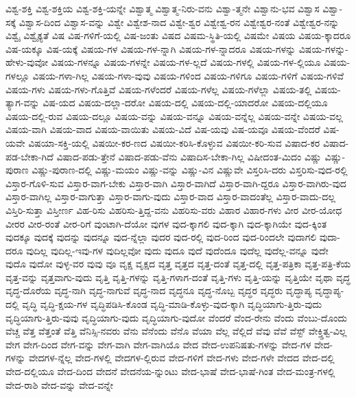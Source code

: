 {ವಿಶ್ವ-ಶಕ್ತಿ
ವಿಶ್ವ-ಶಕ್ತಿಯ
ವಿಶ್ವ-ಶಕ್ತಿ-ಯನ್ನೇ
ವಿಶ್ವಾತ್ಮ
ವಿಶ್ವಾತ್ಮ-ನಿರು-ವನು
ವಿಶ್ವಾ-ತ್ಮನೇ
ವಿಶ್ವಾನು-ಭವ
ವಿಶ್ವಾಸ
ವಿಶ್ವಾ-ಸಕ್ಕೆ
ವಿಶ್ವಾಸ-ದಿಂದ
ವಿಶ್ವಾಸ-ವನ್ನು
ವಿಶ್ವೇ
ವಿಶ್ವೇಶ-ನಾದ
ವಿಶ್ವೇ-ಶ್ವರ
ವಿಶ್ವೇಶ್ವ-ರನ
ವಿಶ್ವೇಶ್ವರ-ನಂತೆ
ವಿಶ್ವೇಶ್ವರ-ನನ್ನು
ವಿಶ್ವೈ
ವಿಶ್ವೈಕ್ಯತೆ
ವಿಷ
ವಿಷ-ಗಳಿಗೆ-ಯಲ್ಲಿ
ವಿಷ-ಜಂತು
ವಿಷದ
ವಿಷಮ-ಸ್ಥಿತಿ-ಯಲ್ಲಿ
ವಿಷಮೇ
ವಿಷಯ
ವಿಷಯ-ಕ್ಕಾದರೂ
ವಿಷ-ಯಕ್ಕೂ
ವಿಷ-ಯಕ್ಕೆ
ವಿಷಯ-ಗಳ
ವಿಷಯ-ಗಳ-ನ್ನಾಗಿ
ವಿಷಯ-ಗಳ-ನ್ನಾದರೂ
ವಿಷಯ-ಗಳನ್ನು
ವಿಷಯ-ಗಳನ್ನು-ಹೇಳು-ವುವೋ
ವಿಷಯ-ಗಳನ್ನೂ
ವಿಷಯ-ಗಳನ್ನೇ
ವಿಷಯ-ಗಳ-ಲ್ಲದೆ
ವಿಷಯ-ಗಳಲ್ಲಿ
ವಿಷಯ-ಗಳ-ಲ್ಲಿಯೂ
ವಿಷಯ-ಗಳಲ್ಲೂ
ವಿಷಯ-ಗಳಾ-ಗಿಲ್ಲ
ವಿಷಯ-ಗಳಾ-ವುವು
ವಿಷಯ-ಗಳಿಂದ
ವಿಷಯ-ಗಳಿಗೂ
ವಿಷಯ-ಗಳಿಗೆ
ವಿಷಯ-ಗಳಿವೆ
ವಿಷಯ-ಗಳು
ವಿಷಯ-ಗಳು-ಗೊತ್ತಿವೆ
ವಿಷಯ-ಗಳೆಂದರೆ
ವಿಷಯ-ಗಳೆಲ್ಲ
ವಿಷಯ-ಗಳೆಲ್ಲಾ
ವಿಷಯ-ತಲ್ಲಿ
ವಿಷಯ-ತ್ಯಾಗ-ವನ್ನು
ವಿಷ-ಯದ
ವಿಷಯ-ದಲ್ಲಾ-ದರೋ
ವಿಷಯ-ದಲ್ಲಿ
ವಿಷಯ-ದಲ್ಲಿ-ಯಾದರೋ
ವಿಷಯ-ದಲ್ಲಿಯೂ
ವಿಷಯ-ದಲ್ಲಿ-ರುವ
ವಿಷಯ-ದಲ್ಲೂ
ವಿಷಯ-ವನ್ನು
ವಿಷಯ-ವನ್ನೂ
ವಿಷಯ-ವನ್ನೆಲ್ಲ
ವಿಷಯ-ವನ್ನೇ
ವಿಷಯ-ವಲ್ಲ
ವಿಷಯ-ವಾಗಿ
ವಿಷಯ-ವಾದ
ವಿಷಯ-ವಾಯಿತು
ವಿಷಯ-ವಿದೆ
ವಿಷ-ಯವು
ವಿಷ-ಯವೂ
ವಿಷಯ-ವೆಂದರೆ
ವಿಷ-ಯವೇ
ವಿಷಯಾ-ಸಕ್ತಿ-ಯಲ್ಲಿ
ವಿಷಯೀ-ಕರ-ಣದ
ವಿಷಯೀ-ಕರಿಸಿ-ಕೊಳ್ಳುವ
ವಿಷಯೀ-ಕರಿ-ಸುವ
ವಿಷಾದ-ಕರ
ವಿಷಾದ-ಪಡ-ಬೇಕಾ-ಗಿದೆ
ವಿಷಾದ-ಪಡು-ತ್ತೇನೆ
ವಿಷಾದ-ಪಡು-ವೆನು
ವಿಷಾದಿಸ-ಬೇಕಾ-ಗಿಲ್ಲ
ವಿಷೀದಂತ-ಮಿದಂ
ವಿಷ್ಣು
ವಿಷ್ಣು-ಪುರಾಣ
ವಿಷ್ಣು-ಪುರಾಣ-ದಲ್ಲಿ
ವಿಷ್ಣು-ಮಯಂ
ವಿಷ್ಣು-ವನ್ನು
ವಿಷ್ಣು-ವಿನ
ವಿಷ್ಣುವೇ
ವಿಸ್ತರಿಸಿ-ದರು
ವಿಸ್ತರಿಸು-ವುದ-ರಲ್ಲಿ
ವಿಸ್ತಾರ-ಗೊಳಿ-ಸುವ
ವಿಸ್ತಾರ-ವಾಗ-ಬೇಕು
ವಿಸ್ತಾರ-ವಾಗಿ
ವಿಸ್ತಾರ-ವಾಗಿದೆ
ವಿಸ್ತಾರ-ವಾಗಿ-ದ್ದರೂ
ವಿಸ್ತಾರ-ವಾಗಿರು-ವುದ
ವಿಸ್ತಾರ-ವಾಗಿಲ್ಲ
ವಿಸ್ತಾರ-ವಾಗುತ್ತಾ
ವಿಸ್ತಾರ-ವಾಗು-ವುದು
ವಿಸ್ತಾರ-ವಾದ
ವಿಸ್ತಾರ-ವಾದಂತೆಲ್ಲ
ವಿಸ್ತಾರ-ವಾದು-ದಲ್ಲ
ವಿಸ್ತಿರಿ-ಸುತ್ತಾ
ವಿಸ್ತೀರ್ಣ
ವಿಹ-ರಿಸು
ವಿಹರಿಸು-ತ್ತಿದ್ದ-ವನು
ವಿಹರಿಸು-ವರು
ವಿಹಾರ
ವಿಹಾರ-ಗಳು
ವೀರ
ವೀರ-ಯೋಧ
ವೀರರ
ವೀರ-ರಂತೆ
ವೀರ-ರಿಗೆ
ವುಂಟಾಗಿ-ದೆಯೋ
ವುಗಳ
ವುದ-ಕ್ಕಾಗಲಿ
ವುದ-ಕ್ಕಾಗಿ
ವುದ-ಕ್ಕಾಗಿಯೇ
ವುದ-ಕ್ಕಿಂತ
ವುದಕ್ಕೂ
ವುದಕ್ಕೆ
ವುದನ್ನು
ವುದನ್ನೂ
ವುದ-ನ್ನೆಲ್ಲಾ
ವುದರ
ವುದ-ರಲ್ಲಿ
ವುದ-ರಿಂದ
ವುದ-ರಿಂದಲೇ
ವುದಾಗಲಿ
ವುದಾ-ದರೂ
ವುದಿಲ್ಲ
ವುದಿಲ್ಲ-ಇವು-ಗಳ
ವುದಿಲ್ಲವೋ
ವುದು
ವುದೂ
ವುದೆ
ವುದೆಂದೂ
ವುದೆಲ್ಲ
ವುದೆಲ್ಲ-ವನ್ನೂ
ವುದೇ
ವುದೊ
ವುದೋ
ವುಳ್ಳ-ವರ
ವುವು
ವೂ
ವೃಕ್ಷ
ವೃಕ್ಷದ
ವೃತ್ತ
ವೃತ್ತದ
ವೃತ್ತ-ದಂತೆ
ವೃತ್ತ-ದಲ್ಲಿ
ವೃತ್ತ-ಪತ್ರಿಕಾ
ವೃತ್ತ-ಪತ್ರಿ-ಕೆಯ
ವೃತ್ತ-ವನ್ನು
ವೃತ್ತವಾಗು-ವುದು
ವೃತ್ತಿ
ವೃತ್ತಿ-ಗಳನ್ನು
ವೃತ್ತಿ-ಗಳಾಗ-ದಂತೆ
ವೃತ್ತಿ-ಗಳು
ವೃತ್ತಿ-ಯನ್ನು
ವೃತ್ತಿಯೇ
ವೃಥಾ
ವೃದ್ಧ
ವೃದ್ಧ-ದೊರೆಯ
ವೃದ್ಧ-ನಾಗಿ
ವೃದ್ಧ-ನಾಗುವೆ
ವೃದ್ಧ-ನಾದ
ವೃದ್ಧನೂ
ವೃದ್ಧ-ನೊಬ್ಬ
ವೃದ್ಧರ
ವೃದ್ಧರು
ವೃದ್ಧಾಪ್ಯ
ವೃದ್ಧಾಪ್ಯ-ದಲ್ಲಿ
ವೃದ್ಧಿ
ವೃದ್ಧಿ-ಕ್ಷಯ-ಗಳ
ವೃದ್ಧಿಪಡಿಸಿ-ಕೊಂಡ
ವೃದ್ಧಿ-ಮಾಡಿ-ಕೊಳ್ಳು-ವುದ-ಕ್ಕಾಗಿ
ವೃದ್ಧಿಯಾಗು-ತ್ತಿರು-ವುದು
ವೃದ್ಧಿಯಾಗು-ತ್ತಿರು-ವುವು
ವೃದ್ಧಿಯಾಗು-ವುದು
ವೃದ್ಧಿಯಾಗು-ವುದೋ
ವೆಂದರೆ
ವೆಂದ-ರೇನು
ವೆಂದು
ವೆಂಬು-ದೊಂದು
ವೆಚ್ಚ
ವೆತ್ತ
ವೆತ್ತಂತೆ
ವೆತ್ತಿ
ವೆನಿಸ್ಸಿ-ನವರು
ವೆನು
ವೆನೆಂದು
ವೆನೊ
ವೆಯಾ
ವೆಲ್ಲ
ವೆಲ್ಲಿದೆ
ವೆವು
ವೆವೆ
ವೆಸ್ಟ್
ವೇಕ್ತ್ತಿತ್ವ-ವಿಲ್ಲ
ವೇಗ
ವೇಗ-ದಿಂದ
ವೇಗ-ವನ್ನು
ವೇಗ-ವಾಗಿ
ವೇಗ-ವಾಗಿಯೊ
ವೇದ
ವೇದ-ಉಪನಿಷತು-ಗಳನ್ನು
ವೇದ-ಗಳ
ವೇದ-ಗಳನ್ನು
ವೇದಗಳ-ನ್ನೆಲ್ಲ
ವೇದ-ಗಳಲ್ಲಿ
ವೇದಗಳ-ಲ್ಲಿರುವ
ವೇದ-ಗಳಿಗೆ
ವೇದ-ಗಳು
ವೇದ-ಗಳೇ
ವೇದದ
ವೇದ-ದಲ್ಲಿ
ವೇದ-ದಲ್ಲಿಯೂ
ವೇದ-ದಿಂದ
ವೇದನೆ
ವೇದನೆಯ-ನ್ನುಂಟು
ವೇದ-ಭಾಷೆ
ವೇದ-ಭಾಷೆ-ಗಿಂತ
ವೇದ-ಮಂತ್ರ-ಗಳಲ್ಲಿ
ವೇದ-ರಾಶಿ
ವೇದ-ವನ್ನು
ವೇದ-ವನ್ನೇ
}
